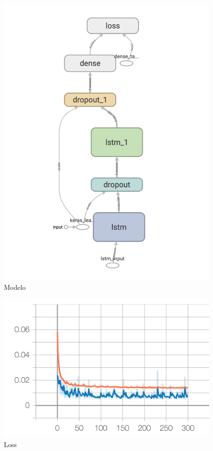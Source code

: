 \documentclass[
	article,			%
	11pt,				%
	oneside,			%
	a4paper,			%
	english,			%
	brazil,				%
	sumario=tradicional
	]{abntex2}
\begin{document}
\begin{anexosenv}
\begin{figure}[htb]
	\caption{\label{model-image}Modelo}
	\begin{center}
		\includegraphics[scale=0.5]{images/model.png}
	\end{center}
\end{figure}

\begin{figure}[htb]
	\caption{\label{loss-graph}Loss}
	\begin{center}
		\includegraphics[scale=0.5]{images/loss.png}
	\end{center}
\end{figure}


\end{anexosenv}
\end{document}
